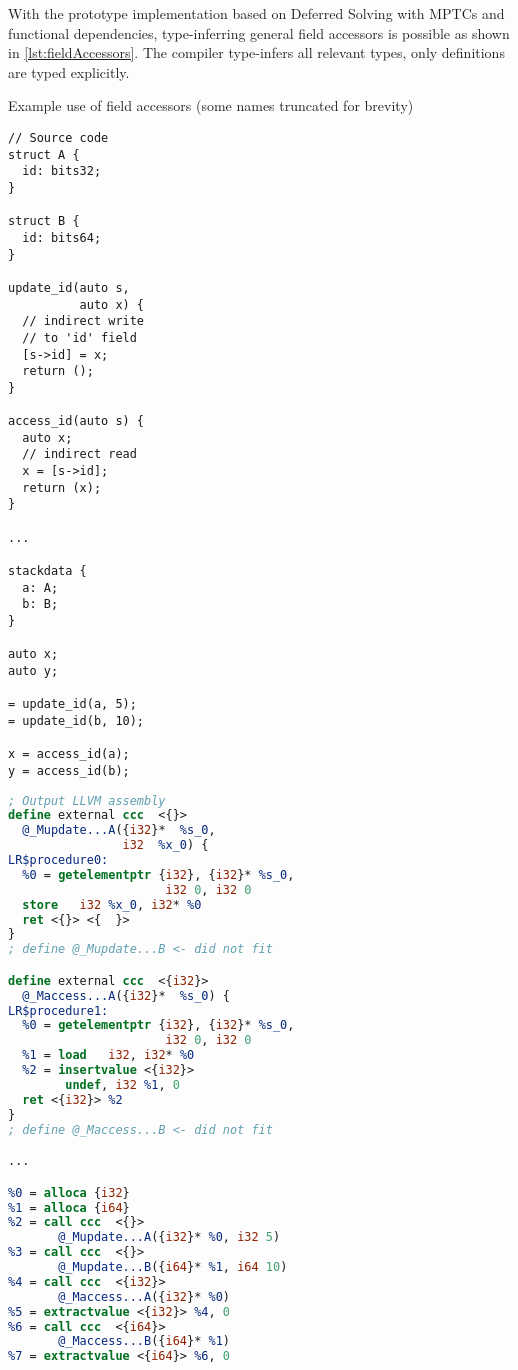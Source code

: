 With the prototype implementation based on Deferred Solving with MPTCs and functional dependencies, type-inferring general field accessors is possible as shown in \cref{lst:fieldAccessors}. The compiler type-infers all relevant types, only  definitions are typed explicitly.

\begin{listing}
    \caption{Example use of field accessors (some names truncated for brevity)}
    \label{lst:fieldAccessors}
    \begin{center}
    \begin{minipage}{0.45\linewidth}
    \begin{lstlisting}[basicstyle=\footnotesize\ttfamily]
// Source code
struct A {
  id: bits32;
}

struct B {
  id: bits64;
}

update_id(auto s,
          auto x) {
  // indirect write
  // to 'id' field
  [s->id] = x;
  return ();
}

access_id(auto s) {
  auto x;
  // indirect read
  x = [s->id];
  return (x);
}

...

stackdata {
  a: A;
  b: B;
}

auto x;
auto y;

= update_id(a, 5);
= update_id(b, 10);

x = access_id(a);
y = access_id(b);
    \end{lstlisting}
    \end{minipage}%
    \begin{minipage}{0.55\linewidth}
    \begin{lstlisting}[language=LLVM,basicstyle=\scriptsize\ttfamily]
; Output LLVM assembly
define external ccc  <{}>
  @_Mupdate...A({i32}*  %s_0,
                i32  %x_0) {
LR$procedure0:
  %0 = getelementptr {i32}, {i32}* %s_0,
                      i32 0, i32 0
  store   i32 %x_0, i32* %0
  ret <{}> <{  }>
}
; define @_Mupdate...B <- did not fit

define external ccc  <{i32}>
  @_Maccess...A({i32}*  %s_0) {
LR$procedure1:
  %0 = getelementptr {i32}, {i32}* %s_0,
                      i32 0, i32 0
  %1 = load   i32, i32* %0
  %2 = insertvalue <{i32}>
        undef, i32 %1, 0
  ret <{i32}> %2
}
; define @_Maccess...B <- did not fit

...

%0 = alloca {i32}
%1 = alloca {i64}
%2 = call ccc  <{}>
       @_Mupdate...A({i32}* %0, i32 5)
%3 = call ccc  <{}>
       @_Mupdate...B({i64}* %1, i64 10)
%4 = call ccc  <{i32}>
       @_Maccess...A({i32}* %0)
%5 = extractvalue <{i32}> %4, 0
%6 = call ccc  <{i64}>
       @_Maccess...B({i64}* %1)
%7 = extractvalue <{i64}> %6, 0

    \end{lstlisting}
    \end{minipage}
    \end{center}
\end{listing}

